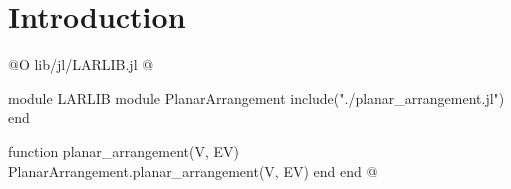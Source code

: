 \chapter{Introduction}



@O lib/jl/LARLIB.jl
@{module LARLIB
    module PlanarArrangement
        include("./planar_arrangement.jl")
    end

    function planar_arrangement(V, EV)
        PlanarArrangement.planar_arrangement(V, EV)
    end
end
@}